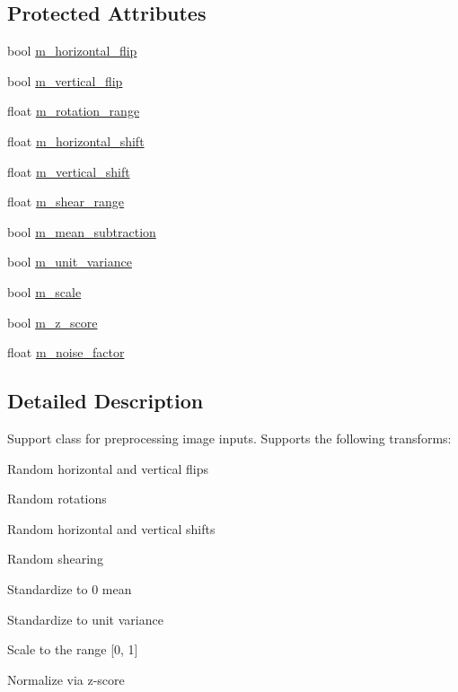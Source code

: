 \subsection*{Protected Attributes}
\begin{DoxyCompactItemize}
\item 
bool \hyperlink{classlbann_1_1lbann__image__preprocessor_a032397d6c642dccd43f4c38393f5d2c1}{m\+\_\+horizontal\+\_\+flip}
\item 
bool \hyperlink{classlbann_1_1lbann__image__preprocessor_a7cfc687cce450403c7b46460f4d08d69}{m\+\_\+vertical\+\_\+flip}
\item 
float \hyperlink{classlbann_1_1lbann__image__preprocessor_a7518ae40fe38862c831832fdaf948d45}{m\+\_\+rotation\+\_\+range}
\item 
float \hyperlink{classlbann_1_1lbann__image__preprocessor_a636f59ffe470f996677601df6179bc41}{m\+\_\+horizontal\+\_\+shift}
\item 
float \hyperlink{classlbann_1_1lbann__image__preprocessor_a06158637d634a4d123ee5501ddd0c7cb}{m\+\_\+vertical\+\_\+shift}
\item 
float \hyperlink{classlbann_1_1lbann__image__preprocessor_a237ead6488b2c04e982fd10510ae03b4}{m\+\_\+shear\+\_\+range}
\item 
bool \hyperlink{classlbann_1_1lbann__image__preprocessor_a734002307d0ef95a31d75a295fa5c3d1}{m\+\_\+mean\+\_\+subtraction}
\item 
bool \hyperlink{classlbann_1_1lbann__image__preprocessor_ae365a9e20f060b44de7835aceceb491c}{m\+\_\+unit\+\_\+variance}
\item 
bool \hyperlink{classlbann_1_1lbann__image__preprocessor_ae00af83d438ab27d6a7b996775fba3b3}{m\+\_\+scale}
\item 
bool \hyperlink{classlbann_1_1lbann__image__preprocessor_a6abe54ada0cacf23e8ac8b6d113bd26b}{m\+\_\+z\+\_\+score}
\item 
float \hyperlink{classlbann_1_1lbann__image__preprocessor_af860c1d78af06e4ae94ad68e3032fe92}{m\+\_\+noise\+\_\+factor}
\end{DoxyCompactItemize}


\subsection{Detailed Description}
Support class for preprocessing image inputs. Supports the following transforms\+:
\begin{DoxyItemize}
\item Random horizontal and vertical flips
\item Random rotations
\item Random horizontal and vertical shifts
\item Random shearing
\item Standardize to 0 mean
\item Standardize to unit variance
\item Scale to the range \mbox{[}0, 1\mbox{]}
\item Normalize via z-\/score 
\end{DoxyItemize}

